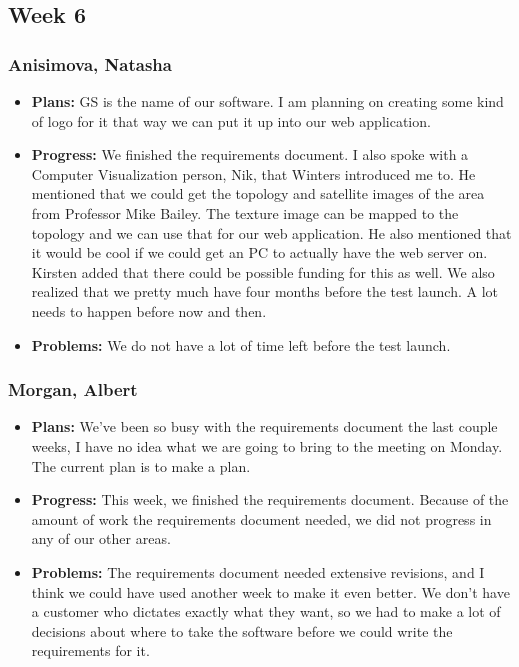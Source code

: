 \documentclass[10pt,draftclsnofoot,onecolumn]{IEEEtran}
\begin{document}
\subsection{Week 6}
\subsubsection{Anisimova, Natasha}
\begin{itemize}
	\item \textbf{Plans: }
	GS is the name of our software. I am planning on creating some kind of logo for it that way we can put it up into our web application. 
	\item \textbf{Progress: }
	We finished the requirements document. I also spoke with a Computer Visualization person, Nik, that Winters introduced me to. He mentioned that we could get the topology and satellite images of the area from Professor Mike Bailey. The texture image can be mapped to the topology and we can use that for our web application. He also mentioned that it would be cool if we could get an PC to actually have the web server on. Kirsten added that there could be possible funding for this as well. We also realized that we pretty much have four months before the test launch. A lot needs to happen before now and then. 
	\item \textbf{Problems: }
	We do not have a lot of time left before the test launch.
\end{itemize}
\subsubsection{Morgan, Albert}
\begin{itemize}
	\item \textbf{Plans: }
	We've been so busy with the requirements document the last couple weeks, I have no idea what we are going to bring to the meeting on Monday. The current plan is to make a plan.
	\item \textbf{Progress: }
	This week, we finished the requirements document. Because of the amount of work the requirements document needed, we did not progress in any of our other areas.
	\item \textbf{Problems: }
	The requirements document needed extensive revisions, and I think we could have used another week to make it even better. We don't have a customer who dictates exactly what they want, so we had to make a lot of decisions about where to take the software before we could write the requirements for it.
\end{itemize}
\end{document}
